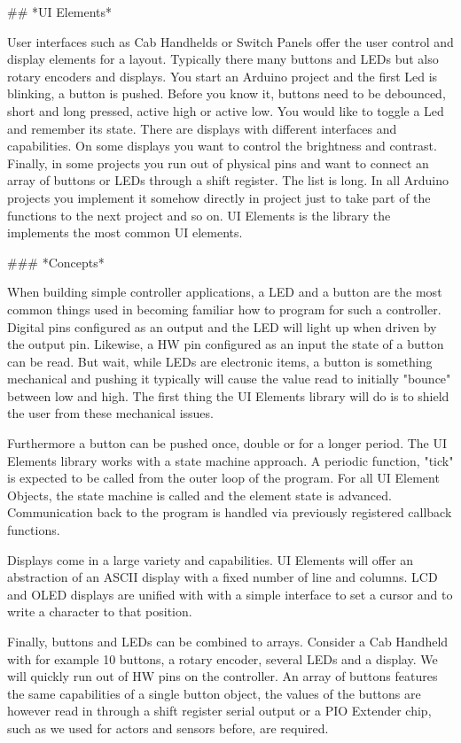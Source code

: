 ## *UI Elements*

User interfaces such as Cab Handhelds or Switch Panels offer the user control and display elements for a layout. Typically there many buttons and LEDs but also rotary encoders and displays. You start an Arduino project and the first Led is blinking, a button is pushed. Before you know it, buttons need to be debounced, short and long pressed, active high or active low. You would like to toggle a Led and remember its state. There are displays with different interfaces and capabilities. On some displays you want to control the brightness and contrast. Finally, in some projects you run out of physical pins and want to connect an array of buttons or LEDs through a shift register. The list is long. In all Arduino projects you implement it somehow directly in project just to take part of the functions to the next project and so on. UI Elements is the library the implements the most common UI elements.

### *Concepts*

When building simple controller applications, a LED and a button are the most common things used in becoming familiar how to program for such a controller. Digital pins configured as an output and the LED will light up when driven by the output pin. Likewise, a HW pin configured as an input the state of a button can be read. But wait, while LEDs are electronic items, a button is something mechanical and pushing it typically will cause the value read to initially "bounce" between low and high. The first thing the UI Elements library will do is to shield the user from these mechanical issues.

Furthermore a button can be pushed once, double or for a longer period. The UI Elements library works with a state machine approach. A periodic function, "tick" is expected to be called from the outer loop of the program. For all UI Element Objects, the state machine is called and the element state is advanced. Communication back to the program is handled via previously registered callback functions.

Displays come in a large variety and capabilities. UI Elements will offer an abstraction of an ASCII display with a fixed number of line and columns. LCD and OLED displays are unified with with a simple interface to set a cursor and to write a character to that position.

Finally, buttons and LEDs can be combined to arrays. Consider a Cab Handheld with for example 10 buttons, a rotary encoder, several LEDs and a display. We will quickly run out of HW pins on the controller. An array of buttons features the same capabilities of a single button object, the values of the buttons are however read in through a shift register serial output or a PIO Extender chip, such as we used for actors and sensors before, are required.

